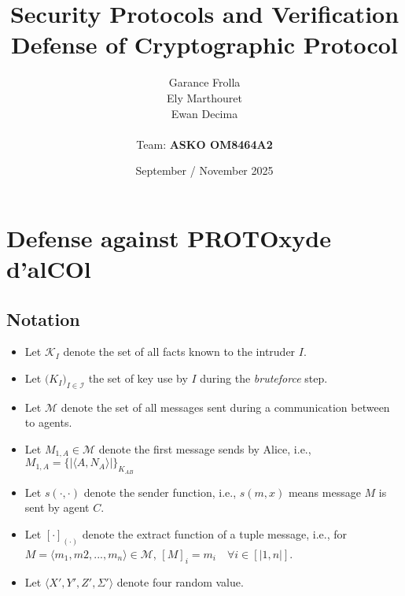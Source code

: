 \documentclass[11pt]{article}
\begin{document}
    \title{
            { \textbf{Security Protocols and Verification}} \\[1ex]
        {\small Defense of Cryptographic Protocol}
    }


    \author{
        Garance Frolla \\
        Ely Marthouret \\
        Ewan Decima\\ \\
        Team: \textbf{ASKO OM8464A2}
    }

    \date{September / November 2025}


    \maketitle
    \tableofcontents
    \newpage

    \section{Defense against PROTOxyde d'alCOl}

    \subsection{Notation}
    \begin{itemize}
        \item Let $\mathcal{K}_I$ denote the set of all facts known to the intruder $I$.
        \item Let $\bigl(K_I\bigr)_{I \in \mathcal{I}}$ the set of key use by $I$ during the \textit{bruteforce} step.
        \item Let $\mathcal{M}$ denote the set of all  messages sent during a communication between to agents.
        \item Let $M_{1,A} \in \mathcal{M}$ denote the first message sends by Alice, i.e., $M_{1,A} = \{|\langle A,N_A \rangle|\}_{K_{AB}}$
        \item Let $s(\cdot, \cdot)$ denote the sender function, i.e., $s(m,x)$ means message $M$ is sent by agent $C$.
        \item Let $[\cdot]_{(\cdot)}$ denote the extract function of a tuple message, i.e., for
                $ M = \langle m_1, m2, ..., m_n \rangle \in \mathcal{M}$, $[M]_i = m_i \quad \forall i \in [|1,n|]$.
        \item Let $\langle X',Y',Z', \Sigma' \rangle$ denote four random value.
    \end{itemize}
    
\end{document}
